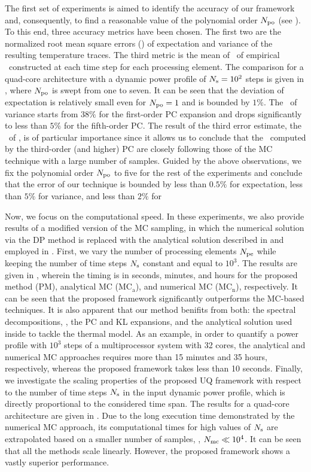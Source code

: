 
The first set of experiments is aimed to identify the accuracy of our framework and, consequently, to find a reasonable value of the polynomial order ${N_\text{po}}$ (see ). To this end, three accuracy metrics have been chosen. The first two are the normalized root mean square errors (\nrmse) of expectation and variance of the resulting temperature traces. The third metric is the mean of \nrmses\ of empirical \pdfs\ constructed at each time step for each processing element. The comparison for a quad-core architecture with a dynamic power profile of $N_\text{s} = 10^2$ steps is given in , where ${N_\text{po}}$ is swept from one to seven. It can be seen that the deviation of expectation is relatively small even for ${N_\text{po}} = 1$ and is bounded by $1\%$. The \nrmse\ of variance starts from $38\%$ for the first-order PC expansion and drops significantly to less than $5\%$ for the fifth-order PC. The result of the third error estimate, the \nrmse\ of \pdfs, is of particular importance since it allows us to conclude that the \pdfs\ computed by the third-order (and higher) PC are closely following those of the MC technique with a large number of samples. Guided by the above observations, we fix the polynomial order ${N_\text{po}}$ to five for the rest of the experiments and conclude that the error of our technique is bounded by less than $0.5\%$ for expectation, less than $5\%$ for variance, and less than $2\%$ for \pdf


Now, we focus on the computational speed. In these experiments, we also provide results of a modified version of the MC sampling, in which the numerical solution via the DP method is replaced with the analytical solution described in  and employed in . First, we vary the number of processing elements ${N_\text{pe}}$ while keeping the number of time steps $N_\text{s}$ constant and equal to $10^3$. The results are given in , wherein the timing is in seconds, minutes, and hours for the proposed method (PM), analytical MC ($\text{MC}_\text{a}$), and numerical MC ($\text{MC}_\text{n}$), respectively. It can be seen that the proposed framework significantly outperforms the MC-based techniques. It is also apparent that our method benifits from both: the spectral decompositions, \ie, the PC and KL expansions, and the analytical solution used inside to tackle the thermal model. As an example, in order to quantify a power profile with $10^3$ steps of a multiprocessor system with 32 cores, the analytical and numerical MC approaches requires more than 15 minutes and 35 hours, respectively, whereas the proposed framework takes less than 10 seconds. Finally, we investigate the scaling properties of the proposed UQ framework with respect to the number of time steps $N_\text{s}$ in the input dynamic power profile, which is directly proportional to the considered time span. The results for a quad-core architecture are given in . Due to the long execution time demonstrated by the numerical MC approach, its computational times for high values of $N_\text{s}$ are extrapolated based on a smaller number of samples, \ie, $N_\text{mc} \ll 10^4$. It can be seen that all the methods scale linearly. However, the proposed framework shows a vastly superior performance.
